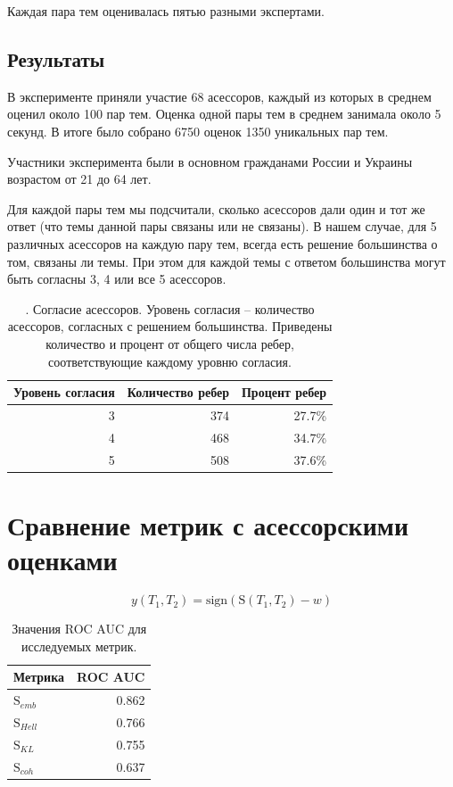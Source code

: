 Каждая пара тем оценивалась пятью разными экспертами.

\subsection{Результаты}
В эксперименте приняли участие 68 асессоров, каждый из которых в среднем оценил около 100 пар тем. Оценка одной пары тем в среднем занимала около 5 секунд.
  В итоге было собрано 6750 оценок 1350 уникальных пар тем.
  
Участники эксперимента были в основном гражданами России и Украины возрастом от 21 до 64 лет.


Для каждой пары тем мы подсчитали, сколько асессоров дали один и тот же ответ (что темы данной пары связаны или не связаны). В нашем случае, для 5 различных асессоров на каждую пару тем, всегда есть решение большинства о том, связаны ли темы. При этом для каждой темы с ответом большинства могут быть согласны 3, 4 или все 5 асессоров. 

\begin{table}[h!]
\centering
\begin{tabular}{r|r|r}
 Уровень согласия & Количество ребер & Процент ребер \\
\hline
3 & 374 & 27.7\% \\
\hline
4 & 468 & 34.7\% \\
\hline
5 & 508 & 37.6\% 
\end{tabular}
\caption{\label{table:agreement}. Согласие асессоров. Уровень согласия -- количество асессоров, согласных с решением большинства. Приведены количество и процент от общего числа ребер, соответствующие каждому уровню согласия.}
\end{table}


\section{Сравнение метрик с асессорскими оценками}

$$y(T_1, T_2) = \text{sign}(\mathrm{S}(T_1, T_2) - w)$$

\begin{table}[h!]
\centering

\begin{tabular}{l|r}
Метрика       & ROC AUC \\
\hline
$\mathrm{S}_{emb}$ &  0.862  \\
\hline
$\mathrm{S}_{Hell}$ &  0.766  \\
\hline
$\mathrm{S}_{KL}$ &  0.755  \\
\hline
$\mathrm{S}_{coh}$ &  0.637  \\
\end{tabular}
\caption{\label{table:metrics_results}Значения ROC AUC для исследуемых метрик.}
\end{table}

